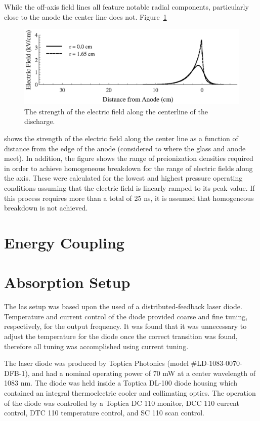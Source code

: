 While the off-axis field lines all feature notable radial components,
particularly close to the anode the center line does not.
Figure~\ref{fig:centere}
\begin{figure}
  \centering
  \includegraphics{./chapters/experiment/figures/centere.eps}
  \caption{The strength of the electric field along the centerline of the
  discharge.}
  \label{fig:centere}
\end{figure}
shows the strength of the electric field along the center line as a function of
distance from the edge of the anode (considered to where the glass and anode
meet). In addition, the figure shows the range of preionization densities
required in order to achieve homogeneous breakdown for the range of electric
fields along the axis. These were calculated for the lowest and highest pressure
operating conditions assuming that the electric field is linearly ramped to its
peak value. If this process requires more than a total of 25 ns, it is assumed
that homogeneous breakdown is not achieved.

\section{Energy Coupling}



\section{Absorption Setup}
The \acs{las} setup was based upon the used of a distributed-feedback
laser diode. Temperature and current control of the diode provided
coarse and fine tuning, respectively, for the output frequency. It was
found that it was unnecessary to adjust the temperature for the diode
once the correct transition was found, therefore all tuning was
accomplished using current tuning.

The laser diode was produced by Toptica Photonics (model
\#LD-1083-0070-DFB-1), and had a nominal operating power of 70 mW at a
center wavelength of 1083 nm. The diode was held inside a Toptica DL-100
diode housing which contained an integral thermoelectric cooler and
collimating optics. The operation of the diode was controlled by a
Toptica DC 110 monitor, DCC 110 current control, DTC 110 temperature
control, and SC 110 scan control.

